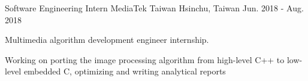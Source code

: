 

\begin{cventries}

\cventry
    {Software Engineering Intern} %
    {MediaTek Taiwan} %
    {Hsinchu, Taiwan} %
    {Jun. 2018 - Aug. 2018} %
    {
      \begin{cvitems} %
        \item {Multimedia algorithm development engineer internship.}
        \item {Working on porting the image processing algorithm from high-level C++ to low-level embedded C, optimizing and writing analytical reports}
      \end{cvitems}
    }

\end{cventries}

